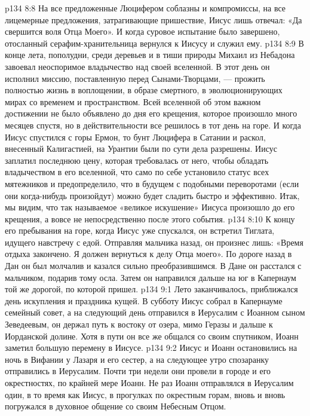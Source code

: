 \vs p134 8:8 На все предложенные Люцифером соблазны и компромиссы, на все лицемерные предложения, затрагивающие пришествие, Иисус лишь отвечал: «Да свершится воля Отца Моего». И когда суровое испытание было завершено, отосланный серафим\hyp{}хранительница вернулся к Иисусу и служил ему.
\vs p134 8:9 \pc В конце лета, пополудни, среди деревьев и в тиши природы Михаил из Небадона завоевал неоспоримое владычество над своей вселенной. В этот день он исполнил миссию, поставленную перед Сынами\hyp{}Творцами, --- прожить полностью жизнь в воплощении, в образе смертного, в эволюционирующих мирах со временем и пространством. Всей вселенной об этом важном достижении не было объявлено до дня его крещения, которое произошло много месяцев спустя, но в действительности все решилось в тот день на горе. И когда Иисус спустился с горы Ермон, то бунт Люцифера в Сатании и раскол, внесенный Калигастией, на Урантии были по сути дела разрешены. Иисус заплатил последнюю цену, которая требовалась от него, чтобы обладать владычеством в его вселенной, что само по себе установило статус всех мятежников и предопределило, что в будущем с подобными переворотами (если они когда\hyp{}нибудь произойдут) можно будет сладить быстро и эффективно. Итак, мы видим, что так называемое «великое искушение» Иисуса произошло до его крещения, а вовсе не непосредственно после этого события.
\vs p134 8:10 К концу его пребывания на горе, когда Иисус уже спускался, он встретил Тиглата, идущего навстречу с едой. Отправляя мальчика назад, он произнес лишь: «Время отдыха закончено. Я должен вернуться к делу Отца моего». По дороге назад в Дан он был молчалив и казался сильно преобразившимся. В Дане он расстался с мальчиком, подарив тому осла. Затем он направился дальше на юг в Капернаум той же дорогой, по которой пришел.
\vs p134 9:1 Лето заканчивалось, приближался день искупления и праздника кущей. В субботу Иисус собрал в Капернауме семейный совет, а на следующий день отправился в Иерусалим с Иоанном сыном Зеведеевым, он держал путь к востоку от озера, мимо Геразы и дальше к Иорданской долине. Хотя в пути он все же общался со своим спутником, Иоанн заметил большую перемену в Иисусе.
\vs p134 9:2 Иисус и Иоанн остановились на ночь в Вифании у Лазаря и его сестер, а на следующее утро спозаранку отправились в Иерусалим. Почти три недели они провели в городе и его окрестностях, по крайней мере Иоанн. Не раз Иоанн отправлялся в Иерусалим один, в то время как Иисус, в прогулках по окрестным горам, вновь и вновь погружался в духовное общение со своим Небесным Отцом.
